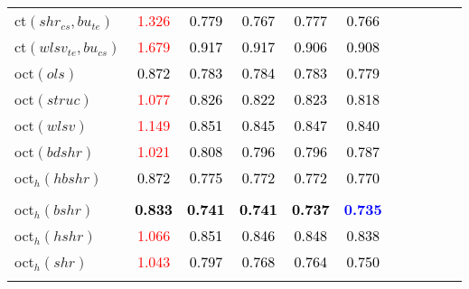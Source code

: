 \begin{tabular}[t]{l|>{}cccc>{}c|ccccc}
ct$(shr_{cs}, bu_{te})$ & \textcolor{red}{1.326} & \textcolor{black}{0.779} & \textcolor{black}{0.767} & \textcolor{black}{0.777} & \textcolor{black}{0.766} &  &  &  &  & \\
ct$(wlsv_{te}, bu_{cs})$ & \textcolor{red}{1.679} & \textcolor{black}{0.917} & \textcolor{black}{0.917} & \textcolor{black}{0.906} & \textcolor{black}{0.908} &  &  &  &  & \\
oct$(ols)$ & \textcolor{black}{0.872} & \textcolor{black}{0.783} & \textcolor{black}{0.784} & \textcolor{black}{0.783} & \textcolor{black}{0.779} &  &  &  &  & \\
oct$(struc)$ & \textcolor{red}{1.077} & \textcolor{black}{0.826} & \textcolor{black}{0.822} & \textcolor{black}{0.823} & \textcolor{black}{0.818} &  &  &  &  & \\
oct$(wlsv)$ & \textcolor{red}{1.149} & \textcolor{black}{0.851} & \textcolor{black}{0.845} & \textcolor{black}{0.847} & \textcolor{black}{0.840} &  &  &  &  & \\
oct$(bdshr)$ & \textcolor{red}{1.021} & \textcolor{black}{0.808} & \textcolor{black}{0.796} & \textcolor{black}{0.796} & \textcolor{black}{0.787} &  &  &  &  & \\
oct$_h(hbshr)$ & \textcolor{black}{0.872} & \textcolor{black}{0.775} & \textcolor{black}{0.772} & \textcolor{black}{0.772} & \textcolor{black}{0.770} &  &  &  &  & \\[-1.5ex]
\hline\\[-1.5ex]
oct$_h(bshr)$ & \textcolor{black}{\textbf{0.833}} & \textcolor{black}{\textbf{0.741}} & \textcolor{black}{\textbf{0.741}} & \textcolor{black}{\textbf{0.737}} & \textcolor{blue}{\textbf{0.735}} &  &  &  &  & \\
oct$_h(hshr)$ & \textcolor{red}{1.066} & \textcolor{black}{0.851} & \textcolor{black}{0.846} & \textcolor{black}{0.848} & \textcolor{black}{0.838} &  &  &  &  & \\
oct$_h(shr)$ & \textcolor{red}{1.043} & \textcolor{black}{0.797} & \textcolor{black}{0.768} & \textcolor{black}{0.764} & \textcolor{black}{0.750} &  &  &  &  & \\
\bottomrule
{}\\
\end{tabular}
